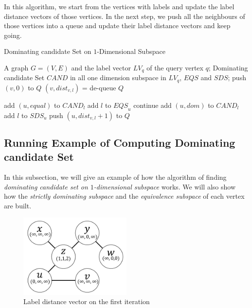 In this algorithm, we start from the vertices with labels and update the label distance vectors of those vertices. In the next step, we push all the neighbours of those vertices into a queue and update their label distance vectors and keep going. 
\begin{algorithm}[h]
  \caption{Dominating candidate Set on $1$-Dimensional Subspace}
  \label{algo:dom_cand_graph}
  \begin{algorithmic}[1]
  \show\LOOP
    \REQUIRE A graph $G=(V,E)$ and the label vector $LV_q$ of the query vertex $q$;
    \ENSURE Dominating candidate Set $\mathit{CAND}$ in all one dimension subspace in $LV_q$, $\mathit{EQS}$ and $\mathit{SDS}$;
            \STATE push $\left(v, 0\right)$ to $Q$
        \ENDFOR
    \ENDFOR
            \STATE $\left(v, dist_{v,l}\right)$ = de-queue $Q$
            
                \STATE add $\left(u, equal\right)$ to $\mathit{CAND}_l$
                \STATE add $l$ to $\mathit{EQS}_u$
                \STATE continue
            \ENDIF
            \STATE add $\left(u, dom\right)$ to $\mathit{CAND}_l$
            \STATE add $l$ to $\mathit{SDS}_u$
                \STATE push $\left(u, dist_{v,l}+1\right)$ to $Q$
            \ENDFOR
        \ENDFOR
    \ENDWHILE
  \end{algorithmic}
\end{algorithm}

\subsection{Running Example of Computing Dominating candidate Set}
\label{dom:run_ex}
In this subsection, we will give an example of how the algorithm of finding \emph{dominating candidate set on $1$-dimensional subspace} works. We will also show how the \emph{strictly dominating subspace} and the \emph{equivalence subspace} of each vertex are built.

\begin{figure}[H]
    \centering
    \includegraphics[width=0.5\textwidth]{figs/graph_example_1}
    \caption{Label distance vector on the first iteration}
    \label{fig:cand_step1}
    
\end{figure}

